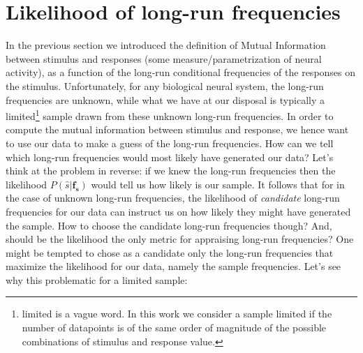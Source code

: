 \section{Likelihood of long-run frequencies}\label{sec:likelihood} 


In the previous section we introduced the definition of Mutual Information between stimulus and responses (some measure/parametrization of neural activity), as a function of the long-run conditional frequencies of the responses on the stimulus. Unfortunately, for any biological neural system, the long-run frequencies are unknown, while what we have at our disposal is typically a limited\footnote{limited is a vague word. In this work we consider a sample limited if the number of datapoints is of the same order of magnitude of the possible combinations of stimulus and response value.} sample drawn from these unknown long-run frequencies. In order to compute the mutual information between stimulus and response, we hence want to use our data to make a guess of the long-run frequencies. How can we tell which long-run frequencies would most likely have generated our data? Let's think at the problem in reverse: if we knew the long-run frequencies then the likelihood $P(\hat{s}\vert \mathbf{f_s})$ would tell us how likely is our sample. It follows that for in the case of unknown long-run frequencies, the likelihood of \textit{candidate} long-run frequencies for our data can instruct us on how likely they might have generated the sample. How to choose the candidate long-run frequencies though? And, should be the likelihood the only metric for appraising long-run frequencies? One might be tempted to chose as a candidate only the long-run frequencies that maximize the likelihood for our data, namely the sample frequencies. Let's see why this problematic for a limited sample:

